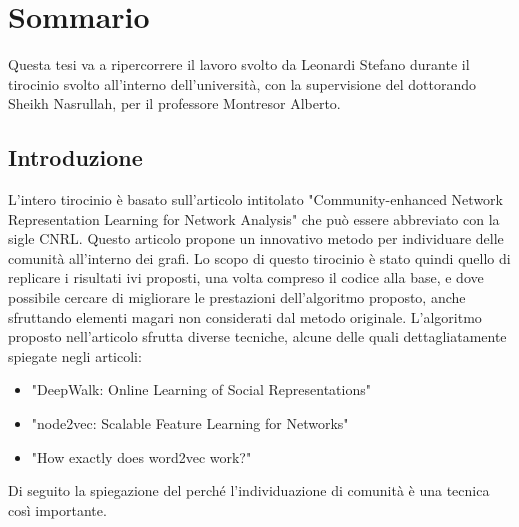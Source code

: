 %
%
%
\chapter{Sommario}
Questa tesi va a ripercorrere il lavoro svolto da Leonardi Stefano durante il tirocinio svolto all'interno dell'università, con la supervisione del dottorando Sheikh Nasrullah, per il professore Montresor Alberto.
%
\section{Introduzione}
L'intero tirocinio è basato sull'articolo intitolato "Community-enhanced Network Representation Learning for Network Analysis" che può essere abbreviato con la sigle CNRL. Questo articolo propone un innovativo metodo per individuare delle comunità all'interno dei grafi. Lo scopo di questo tirocinio è stato quindi quello di replicare i risultati ivi proposti, una volta compreso il codice alla base, e dove possibile cercare di migliorare le prestazioni dell'algoritmo proposto, anche sfruttando elementi magari non considerati dal metodo originale.\newline
L'algoritmo proposto nell'articolo sfrutta diverse tecniche, alcune delle quali dettagliatamente spiegate negli articoli:
\begin{itemize}
	\item "DeepWalk: Online Learning of Social Representations"
	\item "node2vec: Scalable Feature Learning for Networks"
	\item "How exactly does word2vec work?"
\end{itemize} 
Di seguito la spiegazione del perché l'individuazione di comunità è una tecnica così importante.
%
